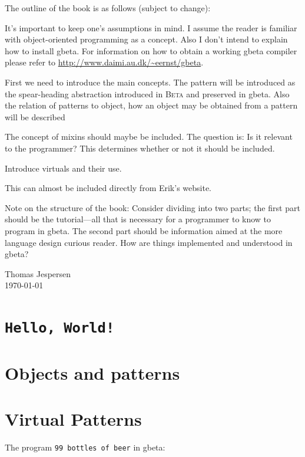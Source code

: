 \documentclass[openany]{memoir}
\newcommand{\gbeta}{\textsf{gbeta}\xspace}
\renewcommand{\beta}{\textsc{Beta}\xspace}
\begin{document}
The outline of the book is as follows (subject to change):

\begin{description}\setlength{\itemsep}{-2pt}
\item[Assumptions] It's important to keep one's assumptions in mind. I
  assume the reader is familiar with object-oriented programming as a
  concept. Also I don't intend to explain how to install \gbeta . For
  information on how to obtain a working \gbeta compiler please refer
  to \url{http://www.daimi.au.dk/~eernst/gbeta}.
\item[Objects and Patterns] First we need to introduce the main concepts. The
  pattern will be introduced as the spear-heading abstraction
  introduced in \beta and preserved in \gbeta . Also the relation of
  patterns to object, how an object may be obtained from a pattern
  will be described
\item[Mixins] The concept of mixins should maybe be included. The
  question is: Is it relevant to the programmer? This determines
  whether or not it should be included.
\item[Virtual patterns] Introduce virtuals and their use.
\item[The fragment language] This can almost be included directly from
  Erik's website.
\end{description}

Note on the structure of the book: Consider dividing into two parts;
the first part should be the tutorial---all that is necessary for a
programmer to know to program in \gbeta . The second part should be
information aimed at the more language design curious reader. How are
things implemented and understood in \gbeta ?

\begin{flushright}
  Thomas Jespersen\\\today
\end{flushright}

\mainmatter

\chapter{\texttt{Hello, World!}}



\chapter{Objects and patterns}



\chapter{Virtual Patterns}



\newpage

The program \texttt{99 bottles of beer} in \gbeta :





\end{document}
